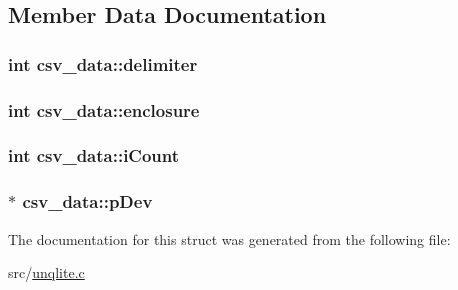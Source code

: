 \subsection{Member Data Documentation}
\hypertarget{structcsv__data_a96de82a978f4a066651d92bc39608aa7}{
\subsubsection[{delimiter}]{\setlength{\rightskip}{0pt plus 5cm}int csv\-\_\-data\-::delimiter}}\label{d0/d69/structcsv__data_a96de82a978f4a066651d92bc39608aa7}
\hypertarget{structcsv__data_a4f06bac8a83d2fc126b8f1edec36f69b}{
\subsubsection[{enclosure}]{\setlength{\rightskip}{0pt plus 5cm}int csv\-\_\-data\-::enclosure}}\label{d0/d69/structcsv__data_a4f06bac8a83d2fc126b8f1edec36f69b}
\hypertarget{structcsv__data_a33a6cb77ea76ccfeeef603992cf20521}{
\subsubsection[{i\-Count}]{\setlength{\rightskip}{0pt plus 5cm}int csv\-\_\-data\-::i\-Count}}\label{d0/d69/structcsv__data_a33a6cb77ea76ccfeeef603992cf20521}
\hypertarget{structcsv__data_ad705a8529fb6354a5c2a032039659ef0}{
\subsubsection[{p\-Dev}]{$\ast$ csv\-\_\-data\-::p\-Dev}}\label{d0/d69/structcsv__data_ad705a8529fb6354a5c2a032039659ef0}


The documentation for this struct was generated from the following file\-:\begin{DoxyCompactItemize}
\item 
src/\hyperlink{unqlite_8c}{unqlite.\-c}\end{DoxyCompactItemize}
